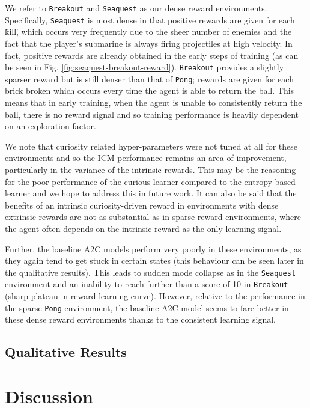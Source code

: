 \documentclass{article}
\begin{document}
We refer to \texttt{Breakout} and \texttt{Seaquest} as our dense reward environments. Specifically, \texttt{Seaquest} is most dense in that positive rewards are given for each \"kill\", which occurs very frequently due to the sheer number of enemies and the fact that the player's submarine is always firing projectiles at high velocity. In fact, positive rewards are already obtained in the early steps of training (as can be seen in Fig. \ref{fig:seaquest-breakout-reward}). \texttt{Breakout} provides a slightly sparser reward but is still denser than that of \texttt{Pong}; rewards are given for each brick broken which occurs every time the agent is able to return the ball. This means that in early training, when the agent is unable to consistently return the ball, there is no reward signal and so training performance is heavily dependent on an exploration factor.

We note that curiosity related hyper-parameters were not tuned at all for these environments and so the ICM performance remains an area of improvement, particularly in the variance of the intrinsic rewards. This may be the reasoning for the poor performance of the curious learner compared to the entropy-based learner and we hope to address this in future work. It can also be said that the benefits of an intrinsic curiosity-driven reward in environments with dense extrinsic rewards are not as substantial as in sparse reward environments, where the agent often depends on the intrinsic reward as the only learning signal.

Further, the baseline A2C models perform very poorly in these environments, as they again tend to get stuck in certain states (this behaviour can be seen later in the qualitative results). This leads to sudden mode collapse as in the \texttt{Seaquest} environment and an inability to reach further than a score of 10 in \texttt{Breakout} (sharp plateau in reward learning curve). However, relative to the performance in the sparse \texttt{Pong} environment, the baseline A2C model seems to fare better in these dense reward environments thanks to the consistent learning signal.

\subsection{Qualitative Results}

\section{Discussion}



\end{document}
